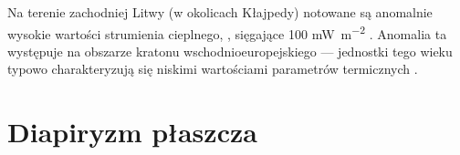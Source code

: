 \documentclass[11.5pt,twoside]{report}
\newcommand{\ct}[1]{\ignorespaces} %
\begin{document}
  	
  	
  	
Na terenie zachodniej Litwy (w okolicach Kłajpedy) notowane są anomalnie wysokie wartości strumienia cieplnego, \parencite{Sliaupa.2012}, sięgające 100 \si{\milli\watt\per\meter\squared} \parencite{Puura.2003}. Anomalia ta występuje na obszarze kratonu wschodnioeuropejskiego --- jednostki tego wieku typowo charakteryzują się niskimi wartościami parametrów termicznych \ct{zrodlo}.

	\section{Diapiryzm płaszcza}

\end{document}
